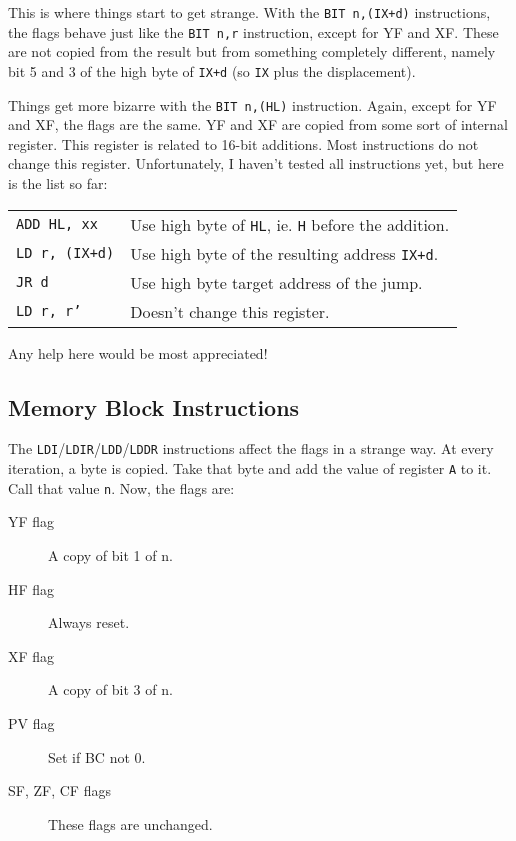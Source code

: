 This is where things start to get strange. With the {\tt BIT n,(IX+d)} instructions, the flags behave just like the {\tt BIT n,r} instruction, except for YF and XF. These are not copied from the result but from something completely different, namely bit 5 and 3 of the high byte of {\tt IX+d} (so {\tt IX} plus the displacement).

Things get more bizarre with the {\tt BIT n,(HL)} instruction. Again, except for YF and XF, the flags are the same. YF and XF are copied from some sort of internal register. This register is related to 16-bit additions. Most instructions do not change this register. Unfortunately, I haven't tested all instructions yet, but here is the list so far:

\begin{tabularx}{\linewidth}{@{}lX}
	{\tt ADD HL, xx}
		& Use high byte of {\tt HL}, ie. {\tt H} before the addition. \\

	{\tt LD r, (IX+d)}
		& Use high byte of the resulting address {\tt IX+d}. \\

	{\tt JR d}
		& Use high byte target address of the jump. \\

	{\tt LD r, r'}
		& Doesn't change this register. \\
\end{tabularx}

Any help here would be most appreciated!


\pagebreak
\subsection{Memory Block Instructions \cite{mrison}}
\label{z80_undocumented_instructions_memory_block}

The {\tt LDI}/{\tt LDIR}/{\tt LDD}/{\tt LDDR} instructions affect the flags in a strange way. At every iteration, a byte is copied. Take that byte and add the value of register {\tt A} to it. Call that value {\tt n}. Now, the flags are:

\begin{description}
 
	\item[YF flag]
	A copy of bit 1 of n.

	\item[HF flag]
	Always reset.

	\item[XF flag]
	A copy of bit 3 of n.

	\item[PV flag]
	Set if BC not 0.

	\item[SF, ZF, CF flags]
	These flags are unchanged.

\end{description}

